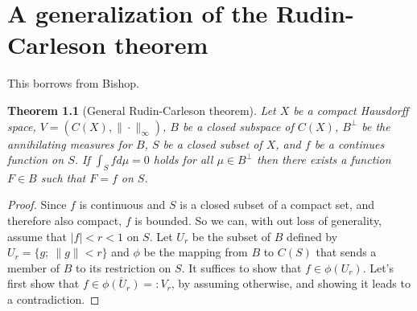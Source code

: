 \documentclass[a4paper,12pt,twoside,BCOR=10mm]{scrbook}
\newtheorem{theorem}{Theorem}
\begin{document}
\chapter{A generalization of the Rudin-Carleson theorem}
This borrows from Bishop. %
\begin{theorem}[General Rudin-Carleson theorem]
Let $X$ be a compact Hausdorff space,
	$V = (C(X), \| \cdot \|_{\infty})$,
	$B$ be a closed subspace of $C(X)$,
	$B^{\bot}$ be the annihilating measures for $B$,
	$S$ be a closed subset of $X$,
	and $f$ be a continues function on $S$.
If $\int_S f d\mu = 0$ holds for all $\mu \in B^{\bot}$ then there exists a function $F \in B$ such that $F = f$ on $S$.
\end{theorem}
\begin{proof}
Since $f$ is continuous and $S$ is a closed subset of a compact set, and therefore also compact, $f$ is bounded.
So we can, with out loss of generality, assume that $|f| < r < 1$ on $S$.
Let $U_r$ be the subset of $B$ defined by $U_r = \{g;\ \|g\| < r\}$ and $\phi$ be the mapping from $B$ to $C(S)$ that sends a member of $B$ to its restriction on $S$.
It suffices to show that $f \in \phi(U_r)$.
Let's first show that $f \in \overline{\phi(U_r)} =: V_r$, by assuming otherwise, and showing it leads to a contradiction.


\end{proof}
\end{document}
